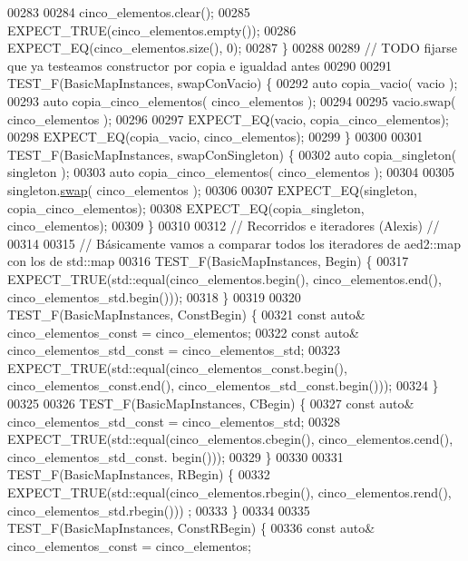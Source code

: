 \begin{DoxyCode}
00283 
00284     cinco\_elementos.clear();
00285     EXPECT\_TRUE(cinco\_elementos.empty());
00286     EXPECT\_EQ(cinco\_elementos.size(), 0);
00287 \}
00288 
00289 \textcolor{comment}{// TODO fijarse que ya testeamos constructor por copia e igualdad antes}
00290 
00291 TEST\_F(BasicMapInstances, swapConVacio) \{
00292     \textcolor{keyword}{auto} copia\_vacio( vacio );
00293     \textcolor{keyword}{auto} copia\_cinco\_elementos( cinco\_elementos );
00294 
00295     vacio.swap( cinco\_elementos );
00296 
00297     EXPECT\_EQ(vacio, copia\_cinco\_elementos);
00298     EXPECT\_EQ(copia\_vacio, cinco\_elementos);
00299 \}
00300 
00301 TEST\_F(BasicMapInstances, swapConSingleton) \{
00302     \textcolor{keyword}{auto} copia\_singleton( singleton );
00303     \textcolor{keyword}{auto} copia\_cinco\_elementos( cinco\_elementos );
00304 
00305     singleton.\hyperlink{classaed2_1_1map_a43ddb71cc91e5c6021a7a1f243d6cc4a_a43ddb71cc91e5c6021a7a1f243d6cc4a}{swap}( cinco\_elementos );
00306 
00307     EXPECT\_EQ(singleton, copia\_cinco\_elementos);
00308     EXPECT\_EQ(copia\_singleton, cinco\_elementos);
00309 \}
00310 
00312 \textcolor{comment}{// Recorridos e iteradores (Alexis) //}
00314 \textcolor{comment}{}
00315 \textcolor{comment}{// Básicamente vamos a comparar todos los iteradores de aed2::map con los de std::map}
00316 TEST\_F(BasicMapInstances, Begin) \{
00317     EXPECT\_TRUE(std::equal(cinco\_elementos.begin(), cinco\_elementos.end(), cinco\_elementos\_std.begin()));
00318 \}
00319 
00320 TEST\_F(BasicMapInstances, ConstBegin) \{
00321     \textcolor{keyword}{const} \textcolor{keyword}{auto}& cinco\_elementos\_const = cinco\_elementos;
00322     \textcolor{keyword}{const} \textcolor{keyword}{auto}& cinco\_elementos\_std\_const = cinco\_elementos\_std;
00323     EXPECT\_TRUE(std::equal(cinco\_elementos\_const.begin(), cinco\_elementos\_const.end(), 
      cinco\_elementos\_std\_const.begin()));
00324 \}
00325 
00326 TEST\_F(BasicMapInstances, CBegin) \{
00327     \textcolor{keyword}{const} \textcolor{keyword}{auto}& cinco\_elementos\_std\_const = cinco\_elementos\_std;
00328     EXPECT\_TRUE(std::equal(cinco\_elementos.cbegin(), cinco\_elementos.cend(), cinco\_elementos\_std\_const.
      begin()));
00329 \}
00330 
00331 TEST\_F(BasicMapInstances, RBegin) \{
00332     EXPECT\_TRUE(std::equal(cinco\_elementos.rbegin(), cinco\_elementos.rend(), cinco\_elementos\_std.rbegin()))
      ;
00333 \}
00334 
00335 TEST\_F(BasicMapInstances, ConstRBegin) \{
00336     \textcolor{keyword}{const} \textcolor{keyword}{auto}& cinco\_elementos\_const = cinco\_elementos;

\end{DoxyCode}
